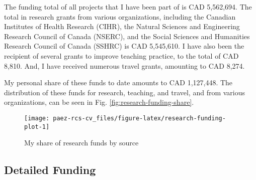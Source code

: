 \documentclass[11pt,a4paper,]{awesome-cv}
\begin{document}
The funding total of all projects that I have been part of is CAD
5,562,694. The total in research grants from various organizations,
including the Canadian Institutes of Health Research (CIHR), the Natural
Sciences and Engineering Research Council of Canada (NSERC), and the
Social Sciences and Humanities Research Council of Canada (SSHRC) is CAD
5,545,610. I have also been the recipient of several grants to improve
teaching practice, to the total of CAD 8,810. And, I have received
numerous travel grants, amounting to CAD 8,274.

My personal share of these funds to date amounts to CAD 1,127,448. The
distribution of these funds for research, teaching, and travel, and from
various organizations, can be seen in Fig.
\ref{fig:research-funding-share}.

\begin{figure}

{\centering \texttt{[image: paez-rcs-cv\_files/figure-latex/research-funding-plot-1]} 

}

\caption{\label{fig:research-funding-share}My share of research funds by source}\label{fig:research-funding-plot}
\end{figure}

\subsection{Detailed Funding}\label{detailed-funding}
\end{document}
